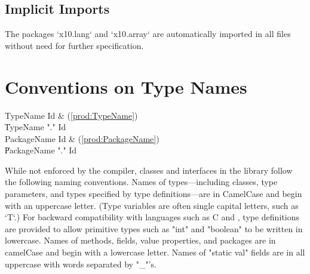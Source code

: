 \subsection{Implicit Imports}

The packages \xcd`x10.lang` and \xcd`x10.array` are automatically imported in all files
without need for further specification.




\section{Conventions on Type Names}

\begin{bbgrammar}
 TypeName    \: Id & (\ref{prod:TypeName})\\%
    \| TypeName \xcd"." Id\\
 PackageName    \: Id & (\ref{prod:PackageName})\\%
    \| PackageName \xcd"." Id\\
\end{bbgrammar}



While not enforced by the compiler, classes and interfaces
in the \Xten{} library follow the following naming conventions.
Names of types---including classes,
type parameters, and types specified by type definitions---are in
CamelCase and begin with an uppercase letter.  (Type variables are often
single capital letters, such as \xcd`T`.)
For backward
compatibility with languages such as C and \java{}, type
definitions are provided to allow primitive types
such as \xcd"int" and \xcd"boolean" to be written in lowercase.
Names of methods, fields, value properties, and packages are in camelCase and
begin with a lowercase letter. 
Names of \xcd"static val" fields are in all uppercase with words
separated by \xcd"_"'s.


